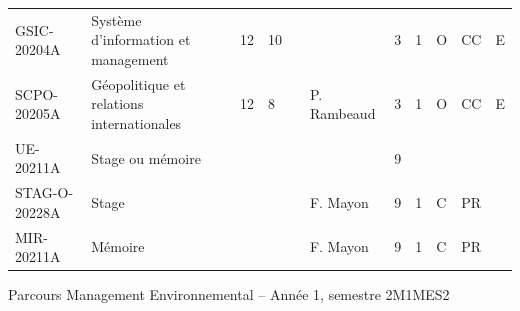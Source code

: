 \documentclass[a4paper,11pt]{article}
\begin{document}
{{\begin{tabular}{lllllllllll}
GSIC-20204A   & Système d'information et management                               & 12 & 10 &    &                 & 3    & 1    & O           & CC             & E         \\
SCPO-20205A   & Géopolitique et relations internationales                         & 12 & 8  &    & P. Rambeaud     & 3    & 1    & O           & CC             & E         \\
\rowcolor[HTML]{C0C0C0} 
UE-20211A     & Stage ou mémoire                                                  &    &    &    &                 & 9    &      &             &                &           \\
STAG-O-20228A & Stage                                                             &    &    &    & F. Mayon        & 9    & 1    & C           & PR             &           \\
MIR-20211A    & Mémoire                                                           &    &    &    & F. Mayon        & 9    & 1    & C           & PR             &           
\end{tabular}}
}{Parcours Management Environnemental -- Année 1, semestre 2}{M1MES2}
\end{document}

